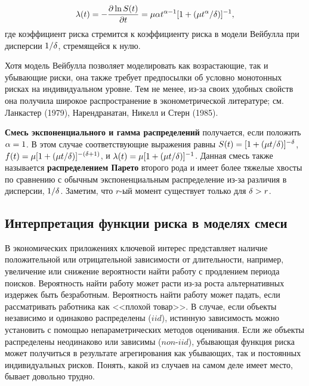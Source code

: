     \begin{align}
        \label{eq:18.14}
        \lambda(t) = -\frac{\partial \ln S(t)}{\partial t} = \mu \alpha t^{\alpha-1}[1 + (\mu t^{\alpha} / \delta)]^{-1},
    \end{align}
где коэффициент риска стремится к коэффициенту риска в модели Вейбулла при дисперсии $1/\delta$, стремящейся к нулю.

Хотя модель Вейбулла позволяет моделировать как возрастающие, так и убывающие риски, она также требует предпосылки об условно монотонных рисках на индивидуальном уровне. Тем не менее, из-за своих удобных свойств она получила широкое распространение в эконометрической литературе; см. Ланкастер (1979), Нарендранатан, Никелл и Стерн (1985).

\textbf{Смесь экспоненциального и гамма распределений} получается, если положить $\alpha = 1$. В этом случае соответствующие выражения равны $S(t) = [1 + (\mu t / \delta)]^{-\delta}$, $f(t) = \mu [1 + (\mu t / \delta)]^{-(\delta + 1)}$, и $\lambda(t) = \mu[1 + (\mu t / \delta)]^{-1}$. Данная смесь также называется \textbf{распределением Парето} второго рода и имеет более тяжелые хвосты по сравнению с обычным экспоненциальным распределение из-за различия в дисперсии, $1/\delta$. Заметим, что $r$-ый момент существует только для $\delta > r$.


\subsection{Интерпретация функции риска в моделях смеси}\label{sec:18.2.4}

\noindent
В экономических приложениях ключевой интерес представляет наличие положительной или отрицательной зависимости от длительности, например, увеличение или снижение вероятности найти работу с продлением периода поисков. Вероятность найти работу может расти из-за роста альтернативных издержек быть безработным. Вероятность найти работу может падать, если рассматривать работника как <<плохой товар>>.
В случае, если объекты независимо и одинаково распределены ($iid$), истинную зависимость можно установить с помощью непараметрических методов оценивания. Если же объекты распределены неодинаково или зависимы ($non$-$iid$), убывающая функция риска может получиться в результате агрегирования как убывающих, так и постоянных индивидуальных рисков. Понять, какой из случаев на самом деле имеет место, бывает довольно трудно.

